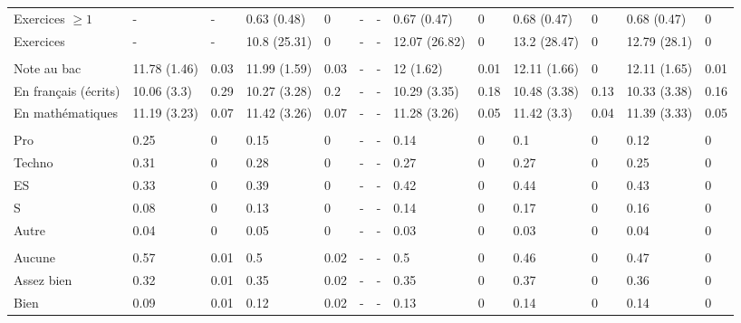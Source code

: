 \documentclass[
]{book}
\begin{document}
\begin{landscape}
\begin{ThreePartTable}
\begin{longtable}[t]{lllllllllllll}
\hspace{1em}Exercices $\geq 1$ & - & - & 0.63 (0.48) & 0 & - & - & 0.67 (0.47) & 0 & 0.68 (0.47) & 0 & 0.68 (0.47) & 0\\
\hspace{1em}Exercices & - & - & 10.8 (25.31) & 0 & - & - & 12.07 (26.82) & 0 & 13.2 (28.47) & 0 & 12.79 (28.1) & 0\\
\addlinespace[0.3em]
\multicolumn{13}{l}{\textbf{Notes au bac}}\\
\hspace{1em}Note au bac & 11.78 (1.46) & 0.03 & 11.99 (1.59) & 0.03 & - & - & 12 (1.62) & 0.01 & 12.11 (1.66) & 0 & 12.11 (1.65) & 0.01\\
\hspace{1em}En français (écrits) & 10.06 (3.3) & 0.29 & 10.27 (3.28) & 0.2 & - & - & 10.29 (3.35) & 0.18 & 10.48 (3.38) & 0.13 & 10.33 (3.38) & 0.16\\
\hspace{1em}En mathématiques & 11.19 (3.23) & 0.07 & 11.42 (3.26) & 0.07 & - & - & 11.28 (3.26) & 0.05 & 11.42 (3.3) & 0.04 & 11.39 (3.33) & 0.05\\
\addlinespace[0.3em]
\multicolumn{13}{l}{\textbf{Série au bac}}\\
\hspace{1em}Pro & 0.25 & 0 & 0.15 & 0 & - & - & 0.14 & 0 & 0.1 & 0 & 0.12 & 0\\
\hspace{1em}Techno & 0.31 & 0 & 0.28 & 0 & - & - & 0.27 & 0 & 0.27 & 0 & 0.25 & 0\\
\hspace{1em}ES & 0.33 & 0 & 0.39 & 0 & - & - & 0.42 & 0 & 0.44 & 0 & 0.43 & 0\\
\hspace{1em}S & 0.08 & 0 & 0.13 & 0 & - & - & 0.14 & 0 & 0.17 & 0 & 0.16 & 0\\
\hspace{1em}Autre & 0.04 & 0 & 0.05 & 0 & - & - & 0.03 & 0 & 0.03 & 0 & 0.04 & 0\\
\addlinespace[0.3em]
\multicolumn{13}{l}{\textbf{Mention au bac}}\\
\hspace{1em}Aucune & 0.57 & 0.01 & 0.5 & 0.02 & - & - & 0.5 & 0 & 0.46 & 0 & 0.47 & 0\\
\hspace{1em}Assez bien & 0.32 & 0.01 & 0.35 & 0.02 & - & - & 0.35 & 0 & 0.37 & 0 & 0.36 & 0\\
\hspace{1em}Bien & 0.09 & 0.01 & 0.12 & 0.02 & - & - & 0.13 & 0 & 0.14 & 0 & 0.14 & 0\\

\end{longtable}
\end{ThreePartTable}
\end{landscape}
\end{document}
